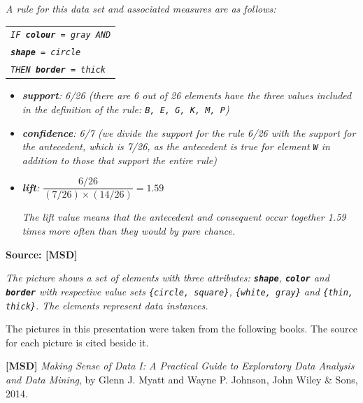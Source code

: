 \twoex
  \parbox[b][0.25\textwidth][t]{0.95\textwidth - \assocruleexwidth}{\tiny \emph{A rule for this data set and associated measures are as follows:}

   \oneex
    \begin{tabular}{l}
      \emph{\texttt{IF \textbf{colour} = gray AND}}  \\
      \emph{\texttt{\textbf{shape} = circle}} \\
      \emph{\texttt{THEN \textbf{border} = thick}} \\
    \end{tabular}

    \oneex
    \begin{itemize}
    \item \emph{\textbf{support}: 6/26 (there are 6 out of 26 elements have the three values included in the definition of the rule: \texttt{B, E, G, K, M, P})}
    \item \emph{\textbf{confidence}: 6/7 (we divide the support for the rule 6/26 with the support for the antecedent, which is 7/26, as the antecedent is true for element \texttt{W} in addition to those that support the entire rule)}
    \item \emph{\textbf{lift}: $\dfrac{6/26}{(7/26)\times(14/26)} = 1.59 $}

      \emph{The lift value means that the antecedent and consequent occur together 1.59 times more often than they would by pure chance.}
    \end{itemize}}

\sticktoprev
{\fontsize{10}{0}\selectfont \textbf{Source: [MSD]} \hfill}

\vspace{-1ex}
\parbox[t]{\assocruleexwidth}{\tiny \emph{The picture shows a set of elements with three attributes: \texttt{\textbf{shape}}, \texttt{\textbf{color}} and \texttt{\textbf{border}} with respective value sets \texttt{\{circle, square\}}, \texttt{\{white, gray\}} and \texttt{\{thin, thick\}}. The elements represent data instances.}}



\newpage


The pictures in this presentation were taken from the following books. The source for each picture is cited beside it. 

\textbf{[MSD]} \emph{Making Sense of Data I: A Practical Guide to Exploratory Data Analysis and Data Mining}, by Glenn J. Myatt and Wayne P. Johnson, John Wiley \& Sons, 2014. 










